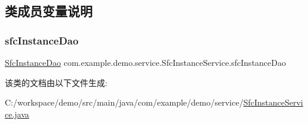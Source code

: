 \subsection{类成员变量说明}
\mbox{\label{classcom_1_1example_1_1demo_1_1service_1_1_sfc_instance_service_ad05557427729d08d1803c00f348db854}} 
\subsubsection{\texorpdfstring{sfc\+Instance\+Dao}{sfcInstanceDao}}
{\footnotesize\ttfamily \mbox{\hyperlink{interfacecom_1_1example_1_1demo_1_1dao_1_1_sfc_instance_dao}{Sfc\+Instance\+Dao}} com.\+example.\+demo.\+service.\+Sfc\+Instance\+Service.\+sfc\+Instance\+Dao\hspace{0.3cm}{\ttfamily [package]}}



该类的文档由以下文件生成\+:\begin{DoxyCompactItemize}
\item 
C\+:/workspace/demo/src/main/java/com/example/demo/service/\mbox{\hyperlink{_sfc_instance_service_8java}{Sfc\+Instance\+Service.\+java}}\end{DoxyCompactItemize}

